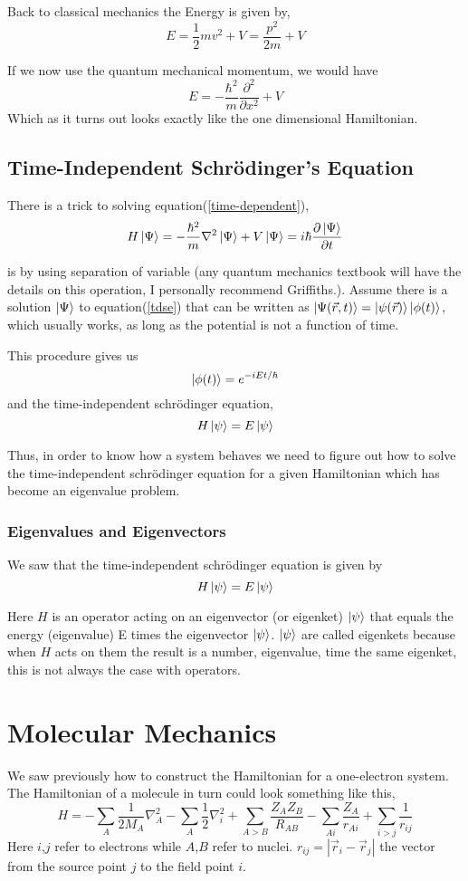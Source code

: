 \documentclass[a4paper]{article}
\begin{document}
Back to classical mechanics the Energy is given by,
$$
E =  \frac{1}{2}mv^2 + V = \frac{p^2}{2m} + V
$$

If we now use the quantum mechanical momentum, we would have
$$
E = - \frac{\hbar^2}{m} \frac{\partial^2}{\partial x^2} + V
$$
Which as it turns out looks exactly like the one dimensional Hamiltonian.

\subsection{Time-Independent Schr\"odinger's Equation}
There is a trick to solving equation(\ref{time-dependent}),
\begin{equation} \label{tdse}
H \ket{\Psi} = -\frac{\hbar^2}{m}\nabla^2 \ket{\Psi} + V\ket{\Psi} = i\hbar\frac{\partial\ket{\Psi}}{\partial t}
\end{equation}

is by using separation of variable (any quantum mechanics textbook will have the details on this operation, I personally recommend Griffiths.).
Assume there is a solution $\ket{\Psi}$ to equation(\ref{tdse}) that can be written as $\ket{\Psi(\vec{r},t)} = \ket{\psi(\vec{r})}\ket{\phi(t)}$, which usually works, as long as the potential is not a function of time.

This procedure gives us
$$
\ket{\phi(t)} = e^{-iEt/\hbar}
$$
and the time-independent schr\"odinger equation,
$$ H\ket{\psi} = E\ket{\psi} $$

Thus, in order to know how a system behaves we need to figure out how to solve the time-independent schr\"odinger equation for a given Hamiltonian which has become an eigenvalue problem.

\subsubsection{Eigenvalues and Eigenvectors}
We saw that the time-independent schr\"odinger equation is given by
$$ H\ket{\psi} = E\ket{\psi} $$

Here $H$ is an operator acting on an eigenvector (or eigenket) $\ket{\psi}$ that equals the energy (eigenvalue) E times the eigenvector $\ket{\psi}$.
$\ket{\psi}$  are called eigenkets because when $H$ acts on them the result is a number, eigenvalue, time the same eigenket, this is not always the case with operators.




\section{Molecular Mechanics}
We saw previously how to construct the Hamiltonian for a one-electron system.
The Hamiltonian of a molecule in turn could look something like this,
\begin{equation} \label{molecule}
H = -\sum_A \frac{1}{2M_A} \nabla^{2}_{A} -\sum_A \frac{1}{2} \nabla^{2}_{i} +
\sum_{A>B} \frac{Z_A Z_B}{R_{AB}} - \sum_{Ai} \frac{Z_A}{r_{Ai}} +
\sum_{i>j} \frac{1}{r_{ij}}
\end{equation}
Here $i$,$j$ refer to electrons while $A$,$B$ refer to nuclei.
$r_{ij} = |\vec{r}_i - \vec{r}_j|$ the vector from the source point $j$ to the field point $i$.
\end{document}
